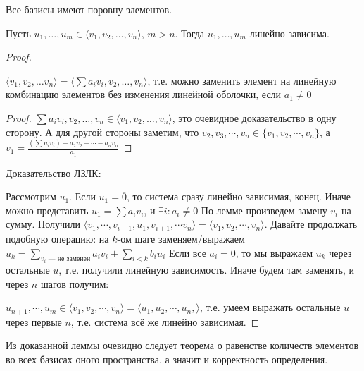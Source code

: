 \begin{theorem}
    Все базисы имеют поровну элементов.
\end{theorem}
\begin{lemma}
    Пусть $u_1, \ldots, u_m \in \langle v_1, v_2, \ldots, v_n \rangle$, $m > n$. Тогда  $u_1, \ldots, u_m$ линейно зависима.
\end{lemma}
\begin{proof}
	\begin{lemma}[О замене]
		$\langle v_1, v_2, \ldots v_n \rangle = \langle \sum a_i v_i, v_2, \ldots, v_n \rangle$, т.е. можно заменить элемент на линейную комбинацию элементов без изменения линейной оболочки, если $a_1 \neq 0$
    \end{lemma}
    \begin{proof}
	    $\sum a_i v_i, v_2, \ldots, v_n \in \langle v_1, v_2, \ldots, v_n \rangle$, это очевидное доказательство в одну сторону. А для другой стороны заметим, что $v_2, v_3, \cdots, v_n \in \lbrace v_1, v_2, \cdots, v_n \rbrace$, а $v_1 = \frac{(\sum a_i v_i) - a_2 v_2 - \cdots - a_n v_n}{a_1}$
    \end{proof}
    
    Доказательство ЛЗЛК:

    Рассмотрим $u_1$. Если $u_1 = \overline{0}$, то система сразу линейно зависимая, конец. Иначе можно представить $u_1 = \sum a_i v_i$, и $\exists i : a_i \neq 0$ По лемме произведем замену $v_i$ на сумму. Получили $\langle v_1, \cdots, v_{i-1}, u_1, v_{i+1}, \cdots v_n \rangle = \langle v_1, v_2, \cdots, v_n \rangle$. Давайте продолжать подобную операцию: на $k$-ом шаге заменяем/выражаем $u_k = \sum_{v_i \text{ --- не заменен}} a_i v_i + \sum_{i < k} b_i u_i$ Если все $a_i = 0$, то мы выражаем $u_k$ через остальные $u$, т.е. получили линейную зависимость. Иначе будем там заменять, и через $n$ шагов получим:

    $u_{n+1}, \cdots, u_m \in \langle v_1, v_2, \cdots, v_n \rangle = \langle u_1, u_2, \cdots, u_n, \rangle$, т.е. умеем выражать остальные $u$ через первые $n$, т.е. система всё же линейно зависимая.
\end{proof}

Из доказанной леммы очевидно следует теорема о равенстве количеств элементов во всех базисах оного пространства, а значит и корректность определения.

